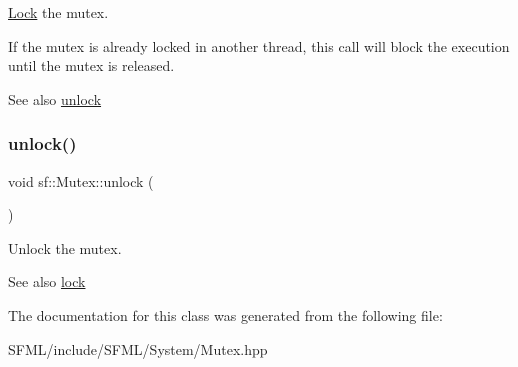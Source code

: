 \mbox{\hyperlink{classsf_1_1_lock}{Lock}} the mutex. 

If the mutex is already locked in another thread, this call will block the execution until the mutex is released.

\begin{DoxySeeAlso}{See also}
\mbox{\hyperlink{classsf_1_1_mutex_ade71268ffc5e80756652058b01c23c33}{unlock}} \begin{DoxyVerb}\end{DoxyVerb}
 
\end{DoxySeeAlso}
\mbox{\label{classsf_1_1_mutex_ade71268ffc5e80756652058b01c23c33}} 
\subsubsection{\texorpdfstring{unlock()}{unlock()}}
{\footnotesize\ttfamily void sf\+::\+Mutex\+::unlock (\begin{DoxyParamCaption}{ }\end{DoxyParamCaption})}



Unlock the mutex. 

\begin{DoxySeeAlso}{See also}
\mbox{\hyperlink{classsf_1_1_mutex_a1a16956a6bbea764480c1b80f2e45763}{lock}} \begin{DoxyVerb}\end{DoxyVerb}
 
\end{DoxySeeAlso}


The documentation for this class was generated from the following file\+:\begin{DoxyCompactItemize}
\item 
S\+F\+M\+L/include/\+S\+F\+M\+L/\+System/Mutex.\+hpp\end{DoxyCompactItemize}

